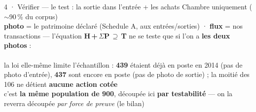 \documentclass[11pt,aspectratio=169]{beamer}
\begin{document}
\begin{frame}{4 · Vérifier --- le test : la sortie dans l'entrée + les achats}
  \hfill{\scriptsize\color{black!55} Chambre uniquement ($\sim$90\,\% du corpus)}\\[1mm]
  \centering
  {\footnotesize \textbf{photo} = le patrimoine déclaré (Schedule A, aux entrées/sorties) ·
   \textbf{flux} = nos transactions --- l'équation \textbf{H\,+\,$\Sigma$P\,$\supseteq$\,T} ne se
   teste que si l'on a \textbf{les deux photos} :}\\[3mm]
  \\[3mm]
  {\footnotesize la loi elle-même limite l'échantillon : \textbf{439} étaient déjà en
   poste en 2014 (pas de photo d'entrée), \textbf{437} sont encore en poste (pas de
   photo de sortie) ; la moitié des 106 ne détient \textbf{aucune action cotée}}\\[1.5mm]
  {\scriptsize\color{black!55} c'est \textbf{la même population de 900}, découpée ici
   \textbf{par testabilité} --- on la reverra découpée \emph{par force de preuve} (le bilan)}
\end{frame}
\end{document}
